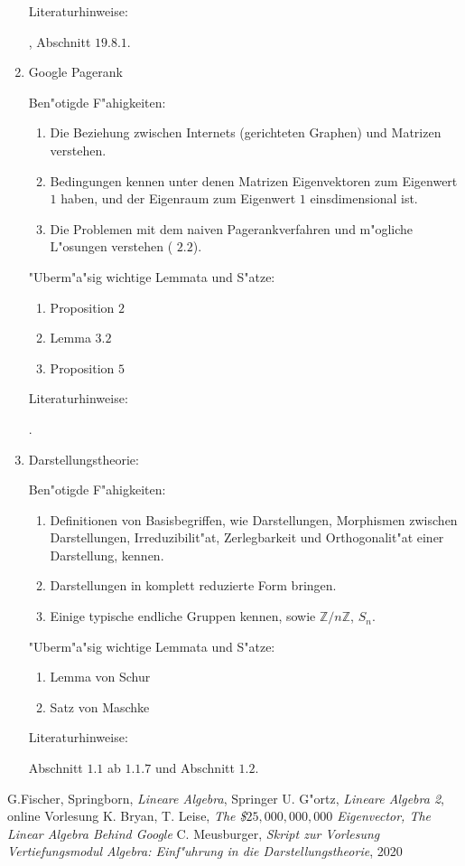 \documentclass[a4paper]{article}
\begin{document}
\begin{enumerate}
Literaturhinweise:

\cite{G}, Abschnitt $19.8.1$.

\item
Google Pagerank

Ben"otigde F"ahigkeiten:
\begin{enumerate}
\item
Die Beziehung zwischen Internets (gerichteten Graphen) und Matrizen verstehen.
\item
Bedingungen kennen unter denen Matrizen Eigenvektoren zum Eigenwert $1$ haben, und der Eigenraum zum Eigenwert $1$ einsdimensional ist.
\item
Die Problemen mit dem naiven Pagerankverfahren und m"ogliche L"osungen verstehen (\cite{BL} $2.2$).
\end{enumerate}

"Uberm"a"sig wichtige Lemmata und S"atze:
\begin{enumerate}
\item
\cite{BL} Proposition $2$
\item
\cite{BL} Lemma $3.2$
\item
\cite{BL} Proposition $5$
\end{enumerate}

Literaturhinweise:

\cite{BL}.

\item
Darstellungstheorie:

Ben"otigde F"ahigkeiten:
\begin{enumerate}
\item
Definitionen von Basisbegriffen, wie Darstellungen, Morphismen zwischen Darstellungen, Irreduzibilit"at, Zerlegbarkeit und Orthogonalit"at einer Darstellung, kennen.
\item
Darstellungen in komplett reduzierte Form bringen.
\item
Einige typische endliche Gruppen kennen, sowie $\mathbb{Z}/n\mathbb{Z}$, $S_n$.
\end{enumerate}

"Uberm"a"sig wichtige Lemmata und S"atze:
\begin{enumerate}
\item
Lemma von Schur
\item
Satz von Maschke 
\end{enumerate}

Literaturhinweise:

\cite{M} Abschnitt $1.1$ ab $1.1.7$ und Abschnitt $1.2$.

\end{enumerate}

\begin{thebibliography}{10}
G.Fischer, Springborn, \emph{Lineare Algebra}, Springer
U. G"ortz, \emph{Lineare Algebra 2}, online Vorlesung
K. Bryan, T. Leise, \emph{The \$$25,000,000,000$ Eigenvector, The Linear Algebra Behind Google}
C. Meusburger, \emph{Skript zur Vorlesung Vertiefungsmodul Algebra: Einf"uhrung in die Darstellungstheorie}, 2020
\end{thebibliography}
\end{document}
